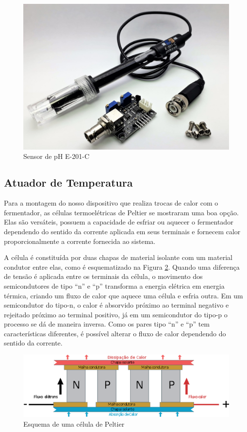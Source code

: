 \begin{figure}[h]
    \centering
    \includegraphics[scale=0.15]{figuras/projeto/hardware/E-201-C.jpg}
    \caption{Sensor de pH E-201-C}
    \label{fig:E-201-C}
\end{figure}


\subsection{Atuador de Temperatura}

Para a montagem do nosso dispositivo que realiza trocas de calor com o fermentador, as células termoelétricas de Peltier se mostraram uma boa opção. Elas são versáteis, possuem a capacidade de esfriar ou aquecer o fermentador dependendo do sentido da corrente aplicada em seus terminais e fornecem calor proporcionalmente a corrente fornecida ao sistema.


A célula é constituída por duas chapas de material isolante com um material condutor entre elas, como é esquematizado na Figura \ref{fig:esquema_peltier}. Quando uma diferença de tensão é aplicada entre os terminais da célula, o movimento dos semicondutores de tipo “n” e “p” transforma a energia elétrica em energia térmica, criando um fluxo de calor que aquece uma célula e esfria outra. Em um semicondutor do tipo-n, o calor é absorvido próximo ao terminal negativo e rejeitado próximo ao terminal positivo, já em um semicondutor do tipo-p o processo se dá de maneira inversa. Como os pares tipo “n” e “p” tem características diferentes, é possível alterar o fluxo de calor dependendo do sentido da corrente.


\begin{figure}[h]
    \centering
    \includegraphics[scale=0.60]{figuras/projeto/hardware/peltier.png}
    \caption{Esquema de uma célula de Peltier}
    \label{fig:esquema_peltier}
\end{figure}



